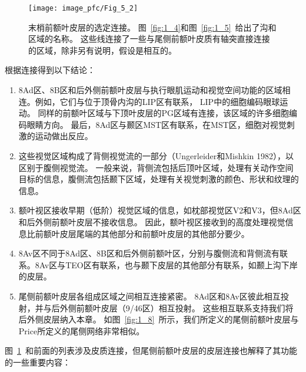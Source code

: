 \begin{figure}
	\centering
	\texttt{[image: image\_pfc/Fig\_5\_2]}
	\caption{末梢前额叶皮层的选定连接。
		图~\ref{fig:1_4}和图~\ref{fig:1_5}~给出了沟和区域的名称。
		这些线连接了一些与尾侧前额叶皮质有轴突直接连接的区域，除非另有说明，假设是相互的。}
	\label{fig:fig_5_2}
\end{figure}


根据连接得到以下结论：

\begin{enumerate}
	\item 8Ad区、8B区和后外侧前额叶皮层与执行眼肌运动和视觉空间功能的区域相连。例如，它们与位于顶骨内沟的LIP区有联系\cite{cavada1989posterior,andersen1990corticocortical}， LIP中的细胞编码眼球运动\cite{snyder1997coding}。
	同样的前额叶区域与下顶叶皮层的PG区域有连接\cite{cavada1989posterior}，该区域的许多细胞编码眼睛方向\cite{sakata1980spatial}。
	最后，8Ad区与颞区MST区有联系，在MST区，细胞对视觉刺激的运动做出反应\cite{celebrini1995microstimulation}。
	\item 这些视觉区域构成了背侧视觉流的一部分\cite{milner2006visual}（Ungerleider和Mishkin 1982），以区别于腹侧视觉流。
	一般来说，背侧流包括后顶叶区域，处理有关动作空间目标的信息，腹侧流包括颞下区域，处理有关视觉刺激的颜色、形状和纹理的信息。
	\item 额叶视区接收早期（低阶）视觉区域的信息，如枕部视觉区V2和V3\cite{stanton1995topography}，但8Ad区和后外侧前额叶皮层不接收信息。
	因此，额叶视区接收到的高度处理视觉信息比前额叶皮层尾端的其他部分和前额叶皮层的其他部分要少。
	\item 8Av区不同于8Ad区、8B区和后外侧前额叶区，分别与腹侧流和背侧流有联系。8Av区与TEO区有联系\cite{webster1994connections}，也与颞下皮层的其他部分有联系，如颞上沟下岸的皮层\cite{petrides1999dorsolateral}。
	\item 尾侧前额叶皮层各组成区域之间相互连接紧密。
	8Ad区和8Av区彼此相互投射，并与后外侧前额叶皮层（9/46区）相互投射。
	这些相互联系支持我们将后外侧皮层纳入本章。
	如图~\ref{fig:1_8}~所示，我们所定义的尾侧前额叶皮层与Price\cite{price2010neurocircuitry}所定义的尾侧网络非常相似。
\end{enumerate}



图~\ref{fig:fig_5_2}~和前面的列表涉及皮质连接，但尾侧前额叶皮层的皮层连接也解释了其功能的一些重要内容：


